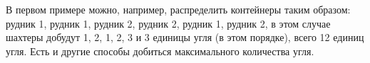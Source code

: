 В первом примере можно, например, распределить контейнеры таким образом: рудник 1, рудник 1,
рудник 2, рудник 2, рудник 1, рудник 2, в этом случае шахтеры добудут 1, 2, 1, 2, 3 и 3 единицы угля (в
этом порядке), всего 12 единиц угля. Есть и другие способы добиться максимального количества угля. 